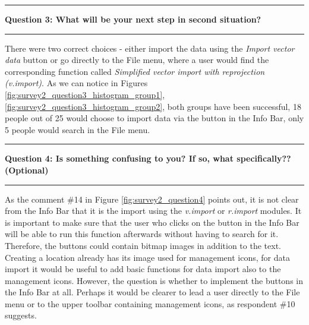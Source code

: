 \documentclass[a4paper,10pt,twoside]{article}
\begin{document}
\newpage
\vspace*{-1cm}
\par\noindent\rule{\textwidth}{0.4pt}
\noindent \textbf{Question 3: What will be your next step in second situation?}
\par\noindent\rule{\textwidth}{0.4pt}

\noindent There were two correct choices - either import the data using the \textit{Import vector data} button or go directly to the File menu, where a user would find the corresponding function called \textit{Simplified vector import with reprojection (v.import)}. As we can notice in Figures \ref{fig:survey2_question3_histogram_group1}, \ref{fig:survey2_question3_histogram_group2}, both groups have been successful, 18 people out of 25 would choose to import data via the button in the Info Bar, only 5 people would search in the File menu.

\par\noindent\rule{\textwidth}{0.4pt}
\noindent \textbf{Question 4: Is something confusing to you? If so, what specifically?? (Optional)}
\par\noindent\rule{\textwidth}{0.4pt}

\noindent As the comment \#14 in Figure \ref{fig:survey2_question4} points out, it is not clear from the Info Bar that it is the import using the \textit{v.import} or \textit{r.import} modules. It is important to make sure that the user who clicks on the button in the Info Bar will be able to run this function afterwards without having to search for it. Therefore, the buttons could contain bitmap images in addition to the text. Creating a location already has its image used for management icons, for data import it would be useful to add basic functions for data import also to the management icons. However, the question is whether to implement the buttons in the Info Bar at all. Perhaps it would be clearer to lead a user directly to the File menu or to the upper toolbar containing management icons, as respondent \#10 suggests.
\end{document}
